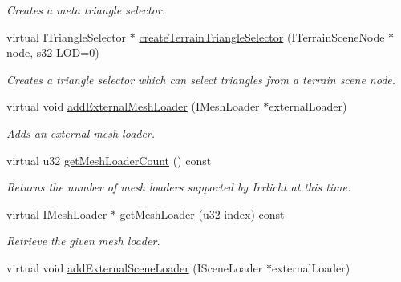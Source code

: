 \begin{DoxyCompactItemize}
\begin{DoxyCompactList}\small\item\em Creates a meta triangle selector. \end{DoxyCompactList}\item 
virtual I\-Triangle\-Selector $\ast$ \hyperlink{classirr_1_1scene_1_1_c_scene_manager_a42dea70677b1745e23afe10a20bf00db}{create\-Terrain\-Triangle\-Selector} (I\-Terrain\-Scene\-Node $\ast$node, s32 L\-O\-D=0)
\begin{DoxyCompactList}\small\item\em Creates a triangle selector which can select triangles from a terrain scene node. \end{DoxyCompactList}\item 
\hypertarget{classirr_1_1scene_1_1_c_scene_manager_ab901dd33ba08bdbccc3852ff564c62df}{virtual void \hyperlink{classirr_1_1scene_1_1_c_scene_manager_ab901dd33ba08bdbccc3852ff564c62df}{add\-External\-Mesh\-Loader} (I\-Mesh\-Loader $\ast$external\-Loader)}\label{classirr_1_1scene_1_1_c_scene_manager_ab901dd33ba08bdbccc3852ff564c62df}

\begin{DoxyCompactList}\small\item\em Adds an external mesh loader. \end{DoxyCompactList}\item 
\hypertarget{classirr_1_1scene_1_1_c_scene_manager_a692823bf5b62174b215fde2993f650fb}{virtual u32 \hyperlink{classirr_1_1scene_1_1_c_scene_manager_a692823bf5b62174b215fde2993f650fb}{get\-Mesh\-Loader\-Count} () const }\label{classirr_1_1scene_1_1_c_scene_manager_a692823bf5b62174b215fde2993f650fb}

\begin{DoxyCompactList}\small\item\em Returns the number of mesh loaders supported by Irrlicht at this time. \end{DoxyCompactList}\item 
\hypertarget{classirr_1_1scene_1_1_c_scene_manager_a1fad87c2e454234eec7469f2e9095791}{virtual I\-Mesh\-Loader $\ast$ \hyperlink{classirr_1_1scene_1_1_c_scene_manager_a1fad87c2e454234eec7469f2e9095791}{get\-Mesh\-Loader} (u32 index) const }\label{classirr_1_1scene_1_1_c_scene_manager_a1fad87c2e454234eec7469f2e9095791}

\begin{DoxyCompactList}\small\item\em Retrieve the given mesh loader. \end{DoxyCompactList}\item 
\hypertarget{classirr_1_1scene_1_1_c_scene_manager_ae16030e393c5bedaa24e2e1684476ce3}{virtual void \hyperlink{classirr_1_1scene_1_1_c_scene_manager_ae16030e393c5bedaa24e2e1684476ce3}{add\-External\-Scene\-Loader} (I\-Scene\-Loader $\ast$external\-Loader)}\label{classirr_1_1scene_1_1_c_scene_manager_ae16030e393c5bedaa24e2e1684476ce3}


\end{DoxyCompactItemize}
